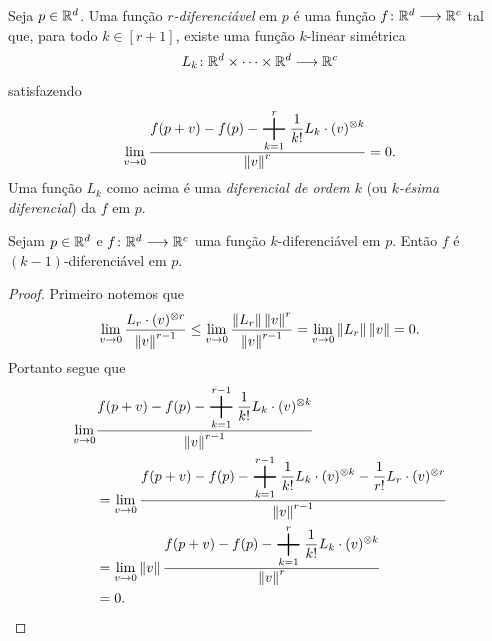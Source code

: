 \begin{defi}
Seja $p \in \mathbb{R}^d$. Uma função \emph{$r$-diferenciável} em $p$ é uma função $f\colon \mathbb{R}^d \longrightarrow \mathbb{R}^c$ tal que, para todo $k \in [r+1]$, existe uma função $k$-linear simétrica
	\begin{equation*}
	L_k\colon \mathbb{R}^d \times \cdots \times \mathbb{R}^d \longrightarrow \mathbb{R}^c
	\end{equation*}
satisfazendo
	\begin{equation*}
	\lim_{v \conv 0} \frac{\displaystyle f(p+v)-f(p)- \sum_{k=1}^r \frac{1}{k!}L_k \cdot (v)^{\otimes k}}{\nor{v}^r} = 0.
	\end{equation*}
Uma função $L_k$ como acima é uma \emph{diferencial de ordem $k$} (ou \emph{$k$-ésima diferencial}) da $f$ em $p$.
\end{defi}

\begin{prop}
Sejam $p \in \mathbb{R}^d$ e $f\colon \mathbb{R}^d \longrightarrow \mathbb{R}^c$ uma função $k$-diferenciável em $p$. Então $f$ é $(k-1)$-diferenciável em $p$.
\end{prop}
\begin{proof}
Primeiro notemos que
	\begin{equation*}
	\lim_{v \rightarrow 0} \frac{L_r \cdot (v)^{\otimes r}}{\left\Vert{v}\right\Vert^{r-1}} \leq \lim_{v \rightarrow 0} \frac{\left\Vert{L_r}\right\Vert \left\Vert{v}\right\Vert^r}{\left\Vert{v}\right\Vert^{r-1}} = \lim_{v \rightarrow 0} \left\Vert{L_r}\right\Vert\left\Vert{v}\right\Vert = 0.
	\end{equation*}
Portanto segue que
	\begin{align*}
	\lim_{v \conv 0} &\frac{\displaystyle f(p+v)-f(p)- \sum_{k=1}^{r-1} \frac{1}{k!}L_k \cdot (v)^{\otimes k}}{\nor{v}^{r-1}} \\
		&= \lim_{v \conv 0} \frac{\displaystyle f(p+v)-f(p)- \sum_{k=1}^{r-1} \frac{1}{k!}L_k \cdot (v)^{\otimes k}-\frac{1}{r!}L_r \cdot (v)^{\otimes r}}{\nor{v}^{r-1}}\\
		&= \lim_{v \conv 0} \nor{v}\frac{\displaystyle f(p+v)-f(p)- \sum_{k=1}^r \frac{1}{k!}L_k \cdot (v)^{\otimes k}}{\nor{v}^r} \\
		&= 0.
	\end{align*}
\end{proof}

